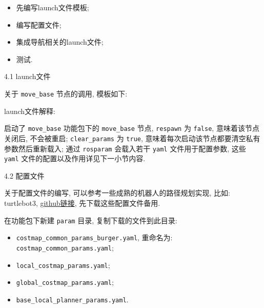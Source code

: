 \documentclass[openany, fontset=windowsold]{ctexbook}
\theoremstyle{kaiti}
\theoremstyle{normal}
\begin{document}
\begin{itemize}
  \item 先编写launch文件模板;
  \item 编写配置文件;
  \item 集成导航相关的launch文件;
  \item 测试.
\end{itemize}

4.1 launch文件

关于 \verb|move_base| 节点的调用, 模板如下:


launch文件解释:

启动了 \verb|move_base| 功能包下的 \verb|move_base| 节点, \verb|respawn| 为 \verb|false|, 意味着该节点关闭后, 不会被重启; \verb|clear_params| 为 \verb|true|, 意味着每次启动该节点都要清空私有参数然后重新载入; 通过 \verb|rosparam| 会载入若干 \verb|yaml| 文件用于配置参数, 这些 \verb|yaml| 文件的配置以及作用详见下一小节内容.

4.2 配置文件

关于配置文件的编写, 可以参考一些成熟的机器人的路径规划实现, 比如: turtlebot3, \href{https://github.com/ROBOTIS-GIT/turtlebot3/tree/master/turtlebot3_navigation/param}{github链接}, 先下载这些配置文件备用.

在功能包下新建 \verb|param| 目录, 复制下载的文件到此目录: 

\begin{itemize}
  \item \verb|costmap_common_params_burger.yaml|, 重命名为: \verb|costmap_common_params.yaml|;
  \item \verb|local_costmap_params.yaml|;
  \item \verb|global_costmap_params.yaml|;
  \item \verb|base_local_planner_params.yaml|.
\end{itemize}
\end{document}
